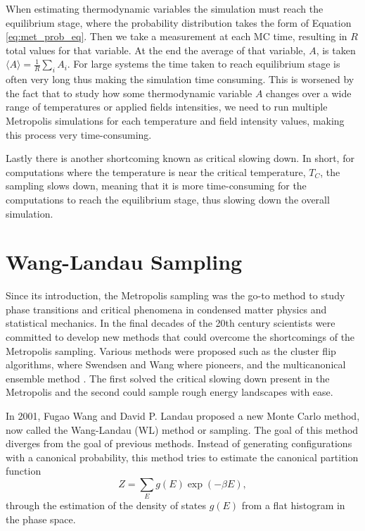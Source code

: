 When estimating thermodynamic variables the simulation must reach the equilibrium stage, where the probability distribution takes the form of Equation \ref{eq:met_prob_eq}. Then we take a measurement at  each MC time, resulting in $R$ total values for that variable. At the end the average of that variable, $A$, is taken $\langle A \rangle = \frac{1}{R} \sum_i A_i$. 
For large systems the time taken to reach equilibrium stage is often very long thus making the simulation time consuming. 
This is worsened by the fact that to study how some thermodynamic variable $A$ changes over a wide range of temperatures or applied fields intensities, we need to run multiple Metropolis simulations for each temperature and field intensity values, making this process very time-consuming.

Lastly there is another shortcoming known as critical slowing down. In short, for computations where the temperature is near the critical temperature, $T_C$, the sampling slows down, meaning that it is more time-consuming for the computations to reach the equilibrium stage, thus slowing down the overall simulation.

\section{Wang-Landau Sampling}

Since its introduction, the Metropolis sampling was the go-to method to study phase transitions and critical phenomena in condensed matter physics and statistical mechanics. In the final decades of the 20th century scientists were committed to develop new methods that could overcome the shortcomings of the Metropolis sampling. Various methods were proposed such as the cluster flip algorithms, where Swendsen and Wang where pioneers, and the multicanonical ensemble method \cite{WL_Original}. The first solved the critical slowing down present in the Metropolis and the second could sample rough energy landscapes with ease. 

In 2001, Fugao Wang and David P. Landau \cite{WL_Original, WL_Edu} proposed a new Monte Carlo method, now called the Wang-Landau (WL) method or sampling. The goal of this method diverges from the goal of previous methods. Instead of generating configurations with a canonical probability, this method tries to estimate the canonical partition function
\begin{equation}
	Z = \sum_E g(E) \exp(-\beta E),
\end{equation}
through the estimation of the density of states $g(E)$ from a flat histogram in the phase space.

